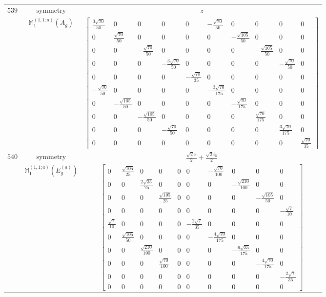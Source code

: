 \documentclass[fleqn,8pt,landscape]{jsarticle}
\begin{document}
\begin{longtable}{ccc}
$ 539 $ & $ \text{symmetry} $ & $ z $ \\
$  $ & $ \mathbb{M}_{1}^{(1,1;a)}(A_{g}) $ & $ \begin{bmatrix} \frac{3 \sqrt{70}}{50} & 0 & 0 & 0 & 0 & - \frac{\sqrt{70}}{50} & 0 & 0 & 0 & 0 \\ 0 & \frac{\sqrt{70}}{50} & 0 & 0 & 0 & 0 & - \frac{\sqrt{105}}{50} & 0 & 0 & 0 \\ 0 & 0 & - \frac{\sqrt{70}}{50} & 0 & 0 & 0 & 0 & - \frac{\sqrt{105}}{50} & 0 & 0 \\ 0 & 0 & 0 & - \frac{3 \sqrt{70}}{50} & 0 & 0 & 0 & 0 & - \frac{\sqrt{70}}{50} & 0 \\ 0 & 0 & 0 & 0 & - \frac{\sqrt{70}}{35} & 0 & 0 & 0 & 0 & 0 \\ - \frac{\sqrt{70}}{50} & 0 & 0 & 0 & 0 & - \frac{3 \sqrt{70}}{175} & 0 & 0 & 0 & 0 \\ 0 & - \frac{\sqrt{105}}{50} & 0 & 0 & 0 & 0 & - \frac{\sqrt{70}}{175} & 0 & 0 & 0 \\ 0 & 0 & - \frac{\sqrt{105}}{50} & 0 & 0 & 0 & 0 & \frac{\sqrt{70}}{175} & 0 & 0 \\ 0 & 0 & 0 & - \frac{\sqrt{70}}{50} & 0 & 0 & 0 & 0 & \frac{3 \sqrt{70}}{175} & 0 \\ 0 & 0 & 0 & 0 & 0 & 0 & 0 & 0 & 0 & \frac{\sqrt{70}}{35} \end{bmatrix} $ \\ \hline
$ 540 $ & $ \text{symmetry} $ & $ \frac{\sqrt{2} x}{2} + \frac{\sqrt{2} i y}{2} $ \\
$  $ & $ \mathbb{M}_{1}^{(1,1;a)}(E_{g}^{(a)}) $ & $ \begin{bmatrix} 0 & \frac{\sqrt{105}}{25} & 0 & 0 & 0 & 0 & - \frac{\sqrt{70}}{100} & 0 & 0 & 0 \\ 0 & 0 & \frac{2 \sqrt{35}}{25} & 0 & 0 & 0 & 0 & - \frac{\sqrt{210}}{100} & 0 & 0 \\ 0 & 0 & 0 & \frac{\sqrt{105}}{25} & 0 & 0 & 0 & 0 & - \frac{\sqrt{105}}{50} & 0 \\ 0 & 0 & 0 & 0 & 0 & 0 & 0 & 0 & 0 & - \frac{\sqrt{7}}{10} \\ \frac{\sqrt{7}}{10} & 0 & 0 & 0 & 0 & - \frac{2 \sqrt{7}}{35} & 0 & 0 & 0 & 0 \\ 0 & \frac{\sqrt{105}}{50} & 0 & 0 & 0 & 0 & - \frac{4 \sqrt{70}}{175} & 0 & 0 & 0 \\ 0 & 0 & \frac{\sqrt{210}}{100} & 0 & 0 & 0 & 0 & - \frac{6 \sqrt{35}}{175} & 0 & 0 \\ 0 & 0 & 0 & \frac{\sqrt{70}}{100} & 0 & 0 & 0 & 0 & - \frac{4 \sqrt{70}}{175} & 0 \\ 0 & 0 & 0 & 0 & 0 & 0 & 0 & 0 & 0 & - \frac{2 \sqrt{7}}{35} \\ 0 & 0 & 0 & 0 & 0 & 0 & 0 & 0 & 0 & 0 \end{bmatrix} $ \\ \hline

\end{longtable}
\end{document}
